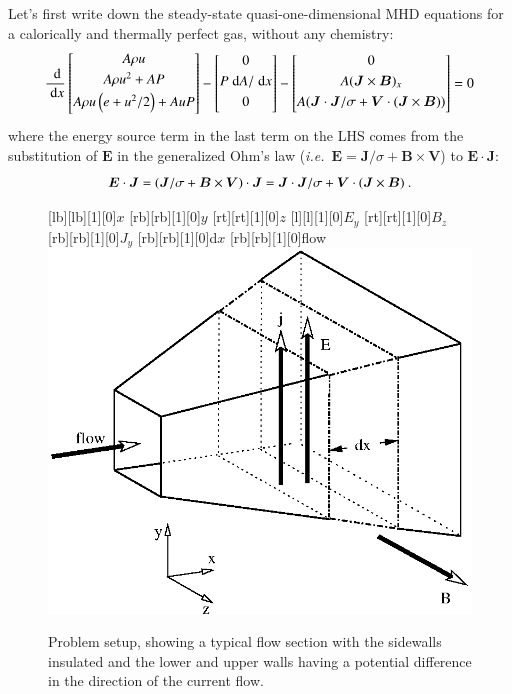 \documentclass{warpdoc}
\newlength\lengthfigure                  %
\newcommand{\ie}{{\it i.e.}}
\newcommand{\ordi}{\; {\rm d}}
\newcommand{\alb}{\vspace{0.1cm}\\} %
\renewcommand{\fontsizefigure}{\footnotesize}
\renewcommand{\vec}[1]{\bm{#1}}
\begin{document}
%
Let's
first write down the steady-state quasi-one-dimensional MHD equations for a calorically and thermally
perfect gas, without any chemistry:
%
\begin{equation}
  \frac{\ordi}{\ordi x}
     \left[
      \begin{array}{@{}c@{}}
        A {\rho} u \alb
        A {\rho} u^2 +  A P\alb
        A {\rho} u \left(e+u^2/2\right)+ A u P \alb
      \end{array}
    \right]
  -\left[
      \begin{array}{@{}c@{}}
      0 \alb
      P \ordi A / \ordi x\alb
      0 \alb
      \end{array}
   \right]
  -\left[
      \begin{array}{@{}c@{}}
      0 \alb
      A (\vec{J} \times \vec{B})_x\alb
      A (\vec{J}\cdot \vec{J}/\sigma + \vec{V} \cdot (\vec{J}\times \vec{B}))\alb
      \end{array}
   \right]=0
\end{equation}
%
where the energy source term in the last term on the LHS comes from the substitution
of $\vec{E}$ in the generalized Ohm's law (\ie\ $\vec{E}=\vec{J}/\sigma + \vec{B} \times \vec{V}$)
to $\vec{E} \cdot \vec{J}$:
%
\begin{displaymath}
  \vec{E} \cdot \vec{J} = (\vec{J}/\sigma + \vec{B} \times \vec{V}) \cdot \vec{J}\alb
    =\vec{J} \cdot \vec{J} / \sigma + \vec{V} \cdot (\vec{J} \times \vec{B})~.
\end{displaymath}
%
\begin{figure}
   \fontsizefigure\center
   [lb][lb][1][0]{$x$}
   [rb][rb][1][0]{$y$}
   [rt][rt][1][0]{$z$}
   [l][l][1][0]{$E_y$}
   [rt][rt][1][0]{$B_z$}
   [rb][rb][1][0]{$J_y$}
   [rb][rb][1][0]{d$x$}
   [rb][rb][1][0]{flow}
   \includegraphics[width=4.0\lengthfigure]{setup.eps}
\caption{Problem setup, showing a typical flow section with the sidewalls
         insulated and the lower and upper walls having a potential difference in the direction of
	 the current flow.}
\label{fig:setup}
\end{figure}
\end{document}
